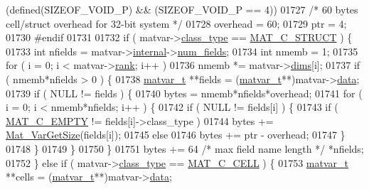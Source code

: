 \begin{DoxyCode}
{{{{{{{{{{{{{{{{{{{{{{{{{{{{{{{       (defined(SIZEOF\_VOID\_P) && (SIZEOF\_VOID\_P == 4))}
01727     \textcolor{comment}{/* 60 bytes cell/struct overhead for 32-bit system */}
01728     overhead = 60;
01729     ptr = 4;
01730 \textcolor{preprocessor}{#endif}
01731 
01732     \textcolor{keywordflow}{if} ( matvar->\hyperlink{group___m_a_t_aff13035bf3265dd7d9425e5d40c839d4}{class\_type} == \hyperlink{group___m_a_t_ggad4d60ae7b709fc81bfd744fb4c857c40acb467c7749c80902b798134c729bb521}{MAT\_C\_STRUCT} ) \{
01733         \textcolor{keywordtype}{int} nfields = matvar->\hyperlink{group___m_a_t_a6e97e3ed9f40c49322c18561c2a94e92}{internal}->\hyperlink{structmatvar__internal_a93fc447484f455eddf9334f2e9e411c2}{num\_fields};
01734         \textcolor{keywordtype}{int} nmemb = 1;
01735         \textcolor{keywordflow}{for} ( i = 0; i < matvar->\hyperlink{group___m_a_t_a84ba70c96ded13cc555fa75b768d9921}{rank}; i++ )
01736             nmemb *= matvar->\hyperlink{group___m_a_t_a8e01234e1c862ce3472bb37f5a09b92c}{dims}[i];
01737         if ( nmemb*nfields > 0 ) \{
01738             \hyperlink{group___m_a_t_structmatvar__t}{matvar\_t} **fields = (\hyperlink{group___m_a_t_structmatvar__t}{matvar\_t}**)matvar->\hyperlink{group___m_a_t_a5672978efa230bbdecdf38ede781f7fa}{data};
01739             if ( NULL != fields ) \{
01740                 bytes = nmemb*nfields*overhead;
01741                 \textcolor{keywordflow}{for} ( i = 0; i < nmemb*nfields; i++ ) \{
01742                     \textcolor{keywordflow}{if} ( NULL != fields[i] ) \{
01743                         \textcolor{keywordflow}{if} ( \hyperlink{group___m_a_t_ggad4d60ae7b709fc81bfd744fb4c857c40a5c76eef0ca0373d25abe49053be6fa9a}{MAT\_C\_EMPTY} != fields[i]->class\_type )
01744                             bytes += \hyperlink{group___m_a_t_gaeeb798fead2f765bddfb19016c7fdbcc}{Mat\_VarGetSize}(fields[i]);
01745                         \textcolor{keywordflow}{else}
01746                             bytes += ptr - overhead;
01747                     \}
01748                 \}
01749             \}
01750         \}
01751         bytes += 64 \textcolor{comment}{/* max field name length */} *nfields;
01752     \} \textcolor{keywordflow}{else} \textcolor{keywordflow}{if} ( matvar->\hyperlink{group___m_a_t_aff13035bf3265dd7d9425e5d40c839d4}{class\_type} == \hyperlink{group___m_a_t_ggad4d60ae7b709fc81bfd744fb4c857c40a2f7abb47a1c51e248bd4e5e03cc81b08}{MAT\_C\_CELL} ) \{
01753         \hyperlink{group___m_a_t_structmatvar__t}{matvar\_t} **cells = (\hyperlink{group___m_a_t_structmatvar__t}{matvar\_t}**)matvar->\hyperlink{group___m_a_t_a5672978efa230bbdecdf38ede781f7fa}{data};
}}}}}}}}}}}}}}}}}}}}}}}}}}}}}}
\end{DoxyCode}
